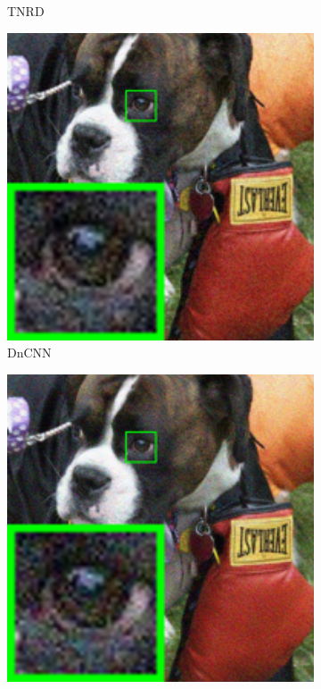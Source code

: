 \begin{figure}
\begin{subfigure}[t]{0.19\textwidth}
		\caption{TNRD}
    \end{subfigure}
    \hfill
    \begin{subfigure}[t]{0.19\textwidth}
        \centering
        \includegraphics[width=1\textwidth]{images/guided/resize_br_DnCNN_dog.png}
		\caption{DnCNN}
    \end{subfigure}
    \hfill
    \begin{subfigure}[t]{0.19\textwidth}
        \centering
        \includegraphics[width=1\textwidth]{images/guided/resize_br_NI_dog.png}

\end{subfigure}
\end{figure}
